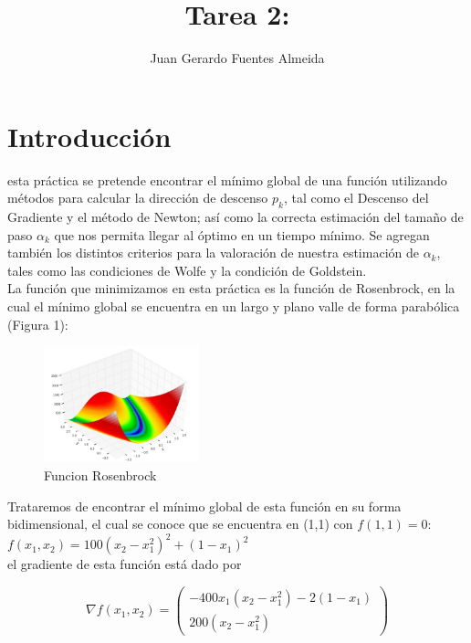 \documentclass[10pt,journal,compsoc]{styles/IEEEtran}
\title{Tarea 2: }
\author{Juan Gerardo Fuentes Almeida}
\begin{document}
\maketitle

\IEEEdisplaynontitleabstractindextext

\IEEEpeerreviewmaketitle

\section{Introducci\'on}

 esta pr\'actica se pretende encontrar el m\'inimo global de una funci\'on utilizando m\'etodos para calcular la direcci\'on de descenso $p_k$, tal como el Descenso del Gradiente y el m\'etodo de Newton; as\'i como la correcta estimaci\'on del tamaño de paso $\alpha_k$ que nos permita llegar al \'optimo en un tiempo m\'inimo. Se agregan tambi\'en los distintos criterios para la valoraci\'on de nuestra estimaci\'on de $\alpha_k$, tales como las condiciones de Wolfe y la condici\'on de Goldstein.\\


La funci\'on que minimizamos en esta pr\'actica es la funci\'on de Rosenbrock, en la cual el m\'inimo global se encuentra en un largo y plano valle de forma parab\'olica (Figura 1):
 
\begin{figure}[hbtp]
\centering
\includegraphics[width=0.4\textwidth]{rosenbrock.jpg}
\caption{Funcion Rosenbrock}
\end{figure}

Trataremos de encontrar el m\'inimo global de esta funci\'on en su forma 
bidimensional, el cual se conoce que se encuentra en (1,1) con $f(1,1)=0$:\\

$f(x_1,x_2)=100(x_2-x_1^2)^2+(1-x_1)^2$\\

el gradiente de esta funci\'on est\'a dado por

\[\nabla f(x_1,x_2)= \left( \begin{array}{cc}
-400x_1(x_2-x_1^2)-2(1-x_1) \\
200(x_2-x_1^2)\end{array} \right)\] 
\end{document}
